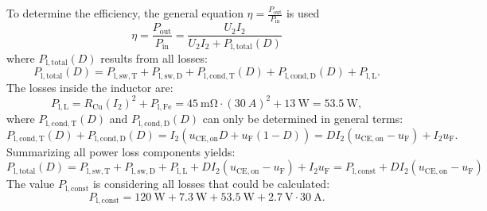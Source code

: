 \begin{solutionblock}
To determine the efficiency, the general equation $\eta=\frac{P_{\mathrm{out}}}{P_{\mathrm{in}}}$ is used
\begin{equation}
    \eta=\frac{P_{\mathrm{out}}}{P_{\mathrm{in}}} = \frac{U_\mathrm{2} I_\mathrm{2}}{U_\mathrm{2} I_\mathrm{2} + P_{\mathrm{l,total}}(D)}
\end{equation}
where $P_{\mathrm{l,total}}(D)$ results from all losses:
\begin{equation}
    P_{\mathrm{l,total}}(D) =  P_{\mathrm{l,sw,T}} +  P_{\mathrm{l,sw,D}} + P_{\mathrm{l,cond,T}}(D) + P_{\mathrm{l,cond,D}}(D) + P_{\mathrm{l,L}}.
\end{equation}
The losses inside the inductor are:
\begin{equation}
   P_{\mathrm{l,L}} = R_{\mathrm{Cu}} (I_{\mathrm{2}})^2 + P_{\mathrm{l,Fe}} = \SI{45}{\mohm} \cdot {(30\ \si{A})^2} + \SI {13}{\watt} = \SI {53.5}{\watt},
\end{equation}
where $P_{\mathrm{l,cond,T}}(D)$ and $P_{\mathrm{l,cond,D}}(D)$ can only be determined in general terms:
\begin{equation}
    P_{\mathrm{l,cond,T}}(D) + P_{\mathrm{l,cond,D}}(D) = I_2( u_{\mathrm{CE,on}} D + u_{\mathrm{F}}(1-D)) = D I_\mathrm{2}(u_{\mathrm{CE,on}} - u_{\mathrm{F}} ) + I_\mathrm{2} u_{\mathrm{F}}.
\end{equation}
Summarizing all power loss components yields:
\begin{equation}
    P_{\mathrm{l,total}}(D) = P_{\mathrm{l,sw,T}}  +  P_{\mathrm{l,sw,D}}  + P_{\mathrm{l,L}} + D I_\mathrm{2}(u_{\mathrm{CE,on}} - u_{\mathrm{F}} ) + I_\mathrm{2} u_{\mathrm{F}} =  P_{\mathrm{l,const}} + D I_\mathrm{2} (u_{\mathrm{CE,on}} - u_{\mathrm{F}})
\end{equation}
The value $P_{\mathrm{l,const}}$ is considering all losses that could be calculated:
\begin{equation}
    P_{\mathrm{l,const}} = \SI {120}{\watt} + \SI {7.3}{\watt} +\SI {53.5}{\watt} + \SI {2.7}{\volt}\cdot\SI {30}{\ampere}.
\end{equation}
\end{solutionblock}

